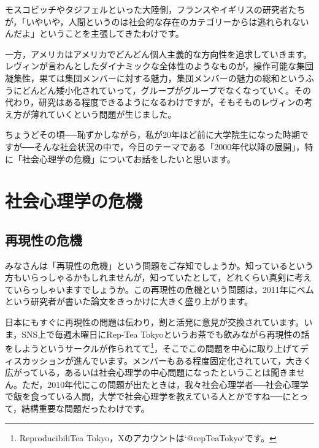 \documentclass{ltjsbook}
\begin{document}
モスコビッチやタジフェルといった大陸側，フランスやイギリスの研究者たちが，「いやいや，人間というのは社会的な存在のカテゴリーからは逃れられないんだよ」ということを主張してきたわけです。

一方，アメリカはアメリカでどんどん個人主義的な方向性を追求していきます。レヴィンが言わんとしたダイナミックな全体性のようなものが，操作可能な集団凝集性，果ては集団メンバーに対する魅力，集団メンバーの魅力の総和というふうにどんどん矮小化されていって，グループがグループでなくなっていく。その代わり，研究はある程度できるようになるわけですが，そもそものレヴィンの考え方が薄れていくという問題が生じました。

ちょうどその頃──恥ずかしながら，私が20年ほど前に大学院生になった時期ですが──そんな社会状況の中で，今日のテーマである「2000年代以降の展開」，特に「社会心理学の危機」についてお話をしたいと思います。

\section{社会心理学の危機}
\subsection{再現性の危機}
みなさんは「再現性の危機」という問題をご存知でしょうか。知っているという方もいらっしゃるかもしれませんが，知っていたとして，どれくらい真剣に考えていらっしゃいますでしょうか。この再現性の危機という問題は，2011年にベムという研究者が書いた論文\parencite{Bem2011}をきっかけに大きく盛り上がります。

日本にもすぐに再現性の問題は伝わり，割と活発に意見が交換されています。いま，SNS上で毎週木曜日にRep-Tea Tokyoというお茶でも飲みながら再現性の話をしようというサークルが作られてて\footnote{ReproducibiliTea Tokyo，Xのアカウントは`@repTeaTokyo`です。}，そこでこの問題を中心に取り上げてディスカッションが進んでいます。メンバーもある程度固定化されていて，大きく広がっている，あるいは社会心理学の中心問題になったということは聞きません。ただ，2010年代にこの問題が出たときは，我々社会心理学者──社会心理学で飯を食っている人間，大学で社会心理学を教えている人とかですね──にとって，結構重要な問題だったわけです。
\end{document}
